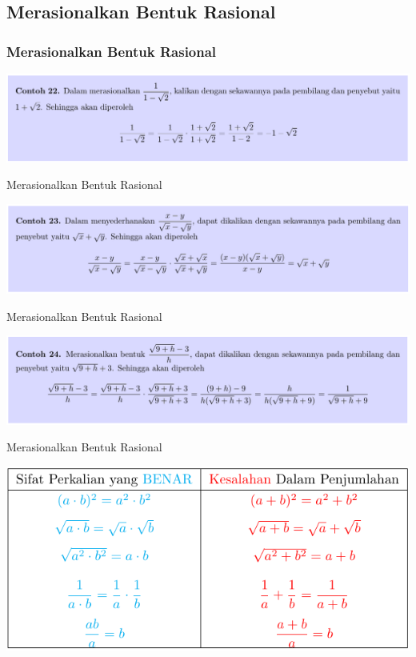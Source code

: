 \documentclass[pdflatex,compress,mathserif]{beamer}
\begin{document}
\subsection{Merasionalkan Bentuk Rasional}

\begin{frame}
	\frametitle{Merasionalkan Bentuk Rasional}
	\begin{center}
		\includegraphics[width=\linewidth]{img/img40}
	\end{center}
\end{frame}

\begin{frame}{Merasionalkan Bentuk Rasional}
	\begin{center}
		\includegraphics[width=\linewidth]{img/img41}
	\end{center}
\end{frame}

\begin{frame}{Merasionalkan Bentuk Rasional}
	\begin{center}
		\includegraphics[width=\linewidth]{img/img42}
	\end{center}
\end{frame}

\begin{frame}{Merasionalkan Bentuk Rasional}
	\begin{center}
		\includegraphics[width=\linewidth]{img/img43}
	\end{center}
\end{frame}
\end{document}
